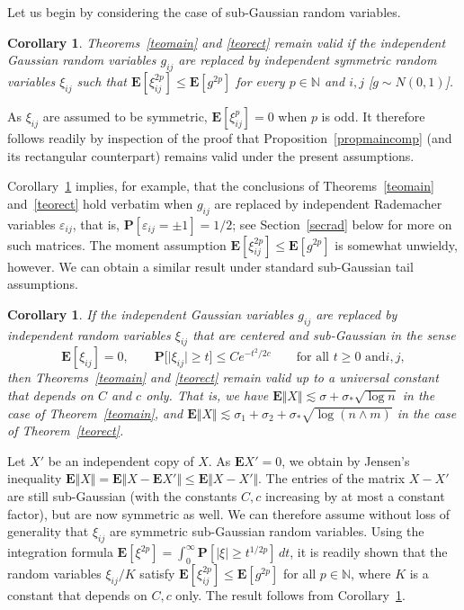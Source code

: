 \documentclass[aop,MSNbibl,dvips]{arximspdf}
\newcommand{\rrvert}{\vert}
\newcommand{\rrVert}{\Vert}
\newcommand{\llvert}{\vert}
\newcommand{\llVert}{\Vert}
\newtheorem{cor}[teo]{Corollary}
\newcommand{\EE}{\mathbf{E}}
\begin{document}
Let us begin by considering the case of sub-Gaussian random variables.

%
\begin{cor}
\label{corsubg}
Theorems~\ref{teomain} and \ref{teorect}
remain valid if the independent Gaussian random variables $g_{ij}$ are
replaced by independent symmetric random variables $\xi_{ij}$ such that
$\EE[\xi_{ij}^{2p}]\le\EE[g^{2p}]$ for every $p\in\mathbb{N}$ and $i,j$
[$g\sim N(0,1)$].
\end{cor}

\begin{pf}
As $\xi_{ij}$ are assumed to be symmetric, $\EE[\xi_{ij}^p]=0$ when
$p$ is
odd. It therefore follows readily by inspection of the proof that
Proposition~\ref{propmaincomp} (and its rectangular
counterpart) remains valid under the present assumptions.
\end{pf}

Corollary~\ref{corsubg} implies, for example, that the conclusions of
Theorems~\ref{teomain} and~\ref{teorect} hold verbatim when
$g_{ij}$ are
replaced by independent Rademacher variables $\varepsilon_{ij}$, that is,
$\mathbf{P}[\varepsilon_{ij}=\pm1]=1/2$; see Section~\ref{secrad} below
for more on such matrices. The moment assumption
$\EE[\xi_{ij}^{2p}]\le\EE[g^{2p}]$ is somewhat\vspace*{2pt} unwieldy, however.
We can
obtain a similar result under standard sub-Gaussian tail assumptions.

%
\begin{cor}
\label{corsubg2}
If the independent Gaussian variables $g_{ij}$ are replaced by independent
random variables $\xi_{ij}$ that are centered and sub-Gaussian in the sense
%
\[
\EE[\xi_{ij}]=0,\qquad\mathbf{P}\bigl[\llvert\xi_{ij}
\rrvert\ge t\bigr] \le Ce^{-t^2/2c}\qquad\mbox{for all }t\ge0 \mbox{ and
}i,j, %
\]
%
then Theorems~\ref{teomain} and \ref{teorect} remain
valid up to a universal constant that depends on $C$ and $c$ only. That
is, we
have $\EE\llVert X\rrVert \lesssim\sigma+ \sigma_*\sqrt{\log n}$ in
the case of
Theorem~\ref{teomain}, and
$\EE\llVert X\rrVert \lesssim\sigma_1+\sigma_2+\sigma_*\sqrt{\log
(n\wedge m)}$
in the case of Theorem~\ref{teorect}.
\end{cor}

\begin{pf}
Let $X'$ be an independent copy of $X$. As $\EE X'=0$, we obtain by
Jensen's inequality $\EE\llVert X\rrVert =\EE\llVert X-\EE
X'\rrVert \le\EE\llVert X-X'\rrVert $.
The entries of the matrix $X-X'$ are still sub-Gaussian (with the constants
$C,c$ increasing by at most a constant factor), but are now symmetric as
well. We can therefore assume without loss of generality that $\xi_{ij}$
are\vspace*{2pt} symmetric sub-Gaussian random variables. Using the integration formula
$\EE[\xi^{2p}] = \int_0^\infty\mathbf{P}[\llvert \xi\rrvert \ge t^{1/2p}]\,dt$,
it is
readily shown that the random variables $\xi_{ij}/K$ satisfy
$\EE[\xi_{ij}^{2p}]\le\EE[g^{2p}]$ for all $p\in\mathbb{N}$,
where $K$ is
a constant that depends on $C,c$ only. The result follows from
Corollary~\ref{corsubg}.
\end{pf}
\end{document}

